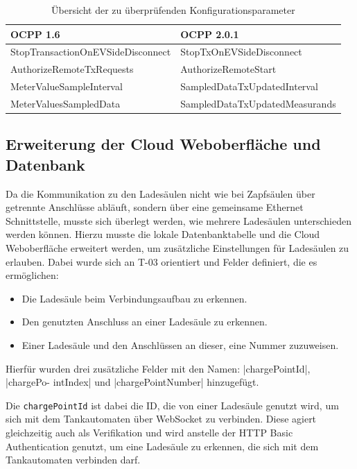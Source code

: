 \begin{table}[H]
	\begin{tabularx}{\linewidth}{|X|X|}
		\hline\textbf{OCPP 1.6}&\textbf{OCPP 2.0.1}\\ \hline
		StopTransactionOnEVSideDisconnect & StopTxOnEVSideDisconnect\\ \hline
		AuthorizeRemoteTxRequests & AuthorizeRemoteStart\\ \hline
		MeterValueSampleInterval & SampledDataTxUpdatedInterval\\ \hline
		MeterValuesSampledData & SampledDataTxUpdatedMeasurands \\ \hline
	\end{tabularx}
	\caption{\label{tab:Ocpp_Parameter} Übersicht der zu überprüfenden Konfigurationsparameter \cite{Eigene_Darstellung}}
\end{table}
\label{Cloud_Erweiterung}
\subsection{Erweiterung der Cloud Weboberfläche und Datenbank}
Da die Kommunikation zu den Ladesäulen nicht wie bei Zapfsäulen über getrennte Anschlüsse abläuft, sondern über eine gemeinsame Ethernet Schnittstelle, musste sich überlegt werden, wie mehrere Ladesäulen unterschieden werden können. Hierzu musste die lokale Datenbanktabelle und die Cloud Weboberfläche erweitert werden, um zusätzliche Einstellungen für Ladesäulen zu erlauben. Dabei wurde sich an T-03 orientiert und Felder definiert, die es ermöglichen: 
\begin{itemize}
	\item Die Ladesäule beim Verbindungsaufbau zu erkennen.
	\item Den genutzten Anschluss an einer Ladesäule zu erkennen.
	\item Einer Ladesäule und den Anschlüssen an dieser, eine Nummer zuzuweisen.
\end{itemize}
Hierfür wurden drei zusätzliche Felder mit den Namen: \spverb|chargePointId|, \spverb|chargePo- intIndex| und \spverb|chargePointNumber| hinzugefügt. \newline

\noindent Die \verb|chargePointId| ist dabei die \acs{ID}, die von einer Ladesäule genutzt wird, um sich mit dem Tankautomaten über WebSocket zu verbinden. Diese agiert gleichzeitig auch als Verifikation und wird anstelle der HTTP Basic Authentication genutzt, um eine Ladesäule zu erkennen, die sich mit dem Tankautomaten verbinden darf.

